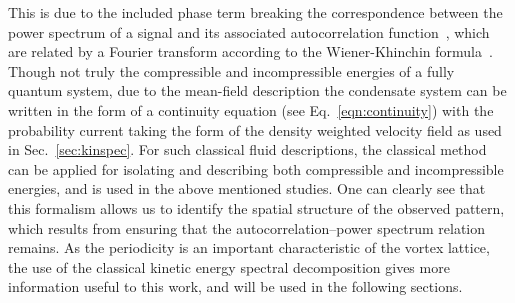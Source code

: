 This is due to the included phase term breaking the correspondence between the power spectrum of a signal and its associated autocorrelation function~\cite{VTX:Reeves_pra_2014}, which are related by a Fourier transform according to the Wiener-Khinchin formula~\cite{BK:Frisch_1995}. Though not truly the compressible and incompressible energies of a fully quantum system, due to the mean-field description the condensate system can be written in the form of a continuity equation (see Eq.~\eqref{eqn:continuity}) with the probability current taking the form of the density weighted velocity field as used in Sec.~\ref{sec:kinspec}. For such classical fluid descriptions, the classical method can be applied for isolating and describing both compressible and incompressible energies, and is used in the above mentioned studies. One can clearly see that this formalism allows us to identify the spatial structure of the observed pattern, which results from ensuring that the autocorrelation--power spectrum relation remains. As the periodicity is an important characteristic of the vortex lattice, the use of the classical kinetic energy spectral decomposition gives more information useful to this work, and will be used in the following sections.




